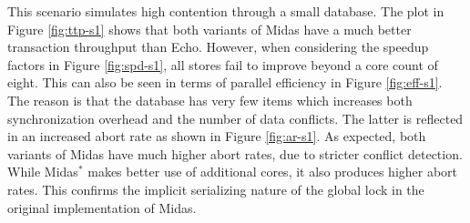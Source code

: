 This scenario simulates high contention through a small database. The plot in Figure \ref{fig:ttp-s1} shows that both variants of Midas have a much better transaction throughput than Echo. However, when considering the speedup factors in Figure \ref{fig:spd-s1}, all stores fail to improve beyond a core count of eight. This can also be seen in terms of parallel efficiency in Figure \ref{fig:eff-s1}. The reason is that the database has very few items which increases both synchronization overhead and the number of data conflicts. The latter is reflected in an increased abort rate as shown in Figure \ref{fig:ar-s1}. As expected, both variants of Midas have much higher abort rates, due to stricter conflict detection. While Midas$^{*}$ makes better use of additional cores, it also produces higher abort rates. This confirms the implicit serializing nature of the global lock in the original implementation of Midas.

